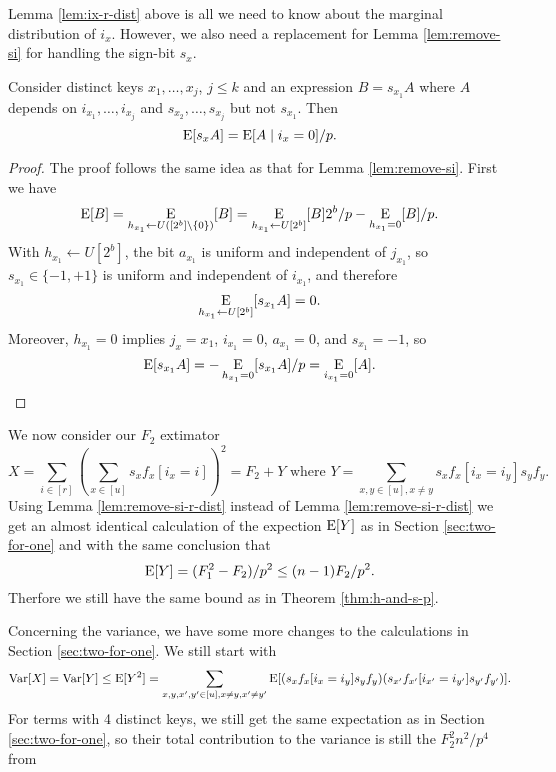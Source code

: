 Lemma \ref{lem:ix-r-dist} above is all we need to know about the
marginal distribution of $i_x$. However, we also need a replacement
for Lemma \ref{lem:remove-si} for handling the sign-bit $s_x$.
\begin{lemma}\label{lem:remove-si-r-dist} Consider distinct keys
   $x_1,\ldots,x_j$, $j\leq k$ and an expression $B=s_{x_1}A$ where $A$
   depends on $i_{x_1},\ldots,i_{x_j}$ and $s_{x_2},\ldots,s_{x_j}$ but not
   $s_{x_1}$. 
   Then
   \begin{equation}\label{eq:remove-si-r-dist}
      \E[s_xA]=\E[A\suchthat i_x=0]/p.
   \end{equation}
\end{lemma}
\begin{proof}
   The proof follows the same idea as that for Lemma \ref{lem:remove-si}.
   First we have
   \[\operatorname*{E}[B]=\operatorname*{E}_{h_{x_1}\gets U([2^b]\setminus\{0\})}[B]=\operatorname*{E}_{h_{x_1}\gets U[2^b]}[B]2^b/p-\operatorname*{E}_{h_{x_1}=0}[B]/p.\]
   With $h_{x_1}\gets U[2^b]$, the bit $a_{x_1}$ is uniform and 
   independent of $j_{x_1}$, so $s_{x_1}\in\{-1,+1\}$ is uniform and 
   independent of $i_{x_1}$, and therefore 
   \[\operatorname*{E}_{h_{x_1}\gets U[2^b]}[s_{x_1}A]=0.\]
   Moreover, $h_{x_1}=0$ implies $j_x={x_1}$, $i_{x_1}=0$, $a_{x_1}=0$,
   and $s_{x_1}=-1$,
   so 
   \[\operatorname*{E}[s_{x_1}A]=-\operatorname*{E}_{h_{x_1}=0}[s_{x_1}A]/p=\operatorname*{E}_{i_{x_1}=0}[A].\]
\end{proof}
We now consider our $F_2$ extimator
\[X=\sum_{i\in[r]}\left( \sum_{x\in[u]}s_x f_x[i_x=i]\right)^2\!
   =F_2+Y\mbox{ where }Y=\sum_{x,y\in[u],x\neq y}
s_x f_x[i_x=i_y]s_y f_y.\]
Using Lemma \ref{lem:remove-si-r-dist} instead of Lemma
\ref{lem:remove-si-r-dist} we get an almost identical calculation 
of the expection $\operatorname*{E}[Y]$ as
in Section \ref{sec:two-for-one} and with the same
conclusion that 
\begin{equation}\label{eq:E-Mersenne-arb-r}
   \operatorname*{E}[Y]=(F_1^2-F_2)/p^2\leq (n-1)F_2/p^2.
\end{equation}
Therfore we still have the same bound  as in Theorem \ref{thm:h-and-s-p}.

Concerning the variance, we have some more changes to the 
calculations in Section \ref{sec:two-for-one}.
We still start with
\[\operatorname*{Var}[X]=\operatorname*{Var}[Y]\leq \operatorname*{E}[Y^2]=
   \sum_{x,y,x',y'\in[u],x\neq y,x'\neq y'}\operatorname*{E}[(s_x f_x[i_x=i_y]s_y f_y)
(s_{x'}f_{x'}[i_{x'}=i_{y'}]s_{y'} f_{y'})].\] 
For terms with 4 distinct keys, we still get the same expectation
as in Section \ref{sec:two-for-one}, so their
total contribution to the variance is still the $F_2^2 n^2/p^4$ from

